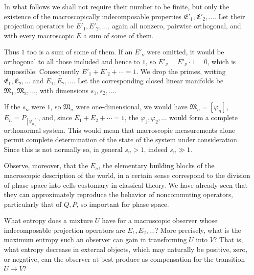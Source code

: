 \documentclass[fontsize=13pt,twoside,openany,headings=normal,parskip=false,bookmarkpackage=false,DIV=calc]{scrbook}
\begin{document}
In what follows we shall not require their number to be finite, but only the existence of the macroscopically indecomposable properties $\mathfrak E'_1,\mathfrak E'_2,\ldots$. Let their projection operators be $E'_1,E'_2,\ldots$, again all nonzero, pairwise orthogonal, and with every macroscopic $E$ a sum of some of them.

Thus $1$ too is a sum of some of them. If an $E'_\nu$ were omitted, it would be orthogonal to all those included and hence to $1$, so $E'_\nu=E'_\nu\cdot1=0$, which is impossible. Consequently $E'_1+E'_2+\cdots=1$. We drop the primes, writing $\mathfrak E_1,\mathfrak E_2,\ldots$ and $E_1,E_2,\ldots$. Let the corresponding closed linear manifolds be $\mathfrak M_1,\mathfrak M_2,\ldots$, with dimensions $s_1,s_2,\ldots$.

If the $s_n$ were $1$, so $\mathfrak M_n$ were one-dimensional, we would have $\mathfrak M_n=[\varphi_n]$, $E_n=P_{[\varphi_n]}$, and, since $E_1+E_2+\cdots=1$, the $\varphi_1,\varphi_2,\ldots$ would form a complete orthonormal system. This would mean that macroscopic measurements alone permit complete determination of the state of the system under consideration. Since this is not normally so, in general $s_n>1$, indeed $s_n\gg1$.

Observe, moreover, that the $E_n$, the elementary building blocks of the macroscopic description of the world, in a certain
\hypertarget{origpage-219}{}%
sense correspond to the division of phase space into cells customary in classical theory. We have already seen that they can approximately reproduce the behavior of noncommuting operators, particularly that of $Q,P$, so important for phase space.

What entropy does a mixture $U$ have for a macroscopic observer whose indecomposable projection operators are $E_1,E_2,\ldots$? More precisely, what is the maximum entropy such an observer can gain in transforming $U$ into $V$? That is, what entropy decrease in external objects, which may naturally be positive, zero, or negative, can the observer at best produce as compensation for the transition $U\to V$?
\end{document}
